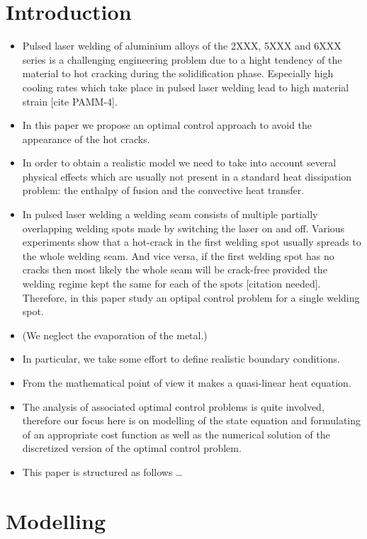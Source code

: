 
\section{Introduction}
\label{sec:introduction}

\begin{itemize}
	\item Pulsed laser welding of aluminium alloys of the 2XXX, 5XXX and 6XXX series is a challenging engineering problem due to a hight tendency of the material to hot cracking during the solidification phase. Especially high cooling rates which take place in pulsed laser welding lead to high material strain [cite PAMM-4].
	\item In this paper we propose an optimal control approach to avoid the appearance of the hot cracks.
	\item In order to obtain a realistic model we need to take into account several physical effects which are usually not present in a standard heat dissipation problem: the enthalpy of fusion and the convective heat transfer.
	\item In pulsed laser welding a welding seam consists of multiple partially overlapping welding spots made by switching the laser on and off. Various experiments show that a hot-crack in the first welding spot usually spreads to the whole welding seam. And vice versa, if the first welding spot has no cracks then most likely the whole seam will be crack-free provided the welding regime kept the same for each of the spots [citation needed]. Therefore, in this paper study an optipal control problem for a single welding spot.
	\item (We neglect the evaporation of the metal.)
	\item In particular, we take some effort to define realistic boundary conditions.
	\item From the mathematical point of view it makes a quasi-linear heat equation.
	\item The analysis of associated optimal control problems is quite involved, therefore our focus here is on modelling of the state equation and formulating of an appropriate cost function as well as the numerical solution of the discretized version of the optimal control problem.
	\item This paper is structured as follows \ldots
\end{itemize}


\section{Modelling}
\label{sec:modelling}

